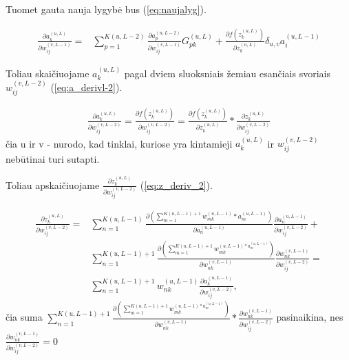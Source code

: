 Tuomet gauta nauja lygybė bus (\ref{eq:naujalyg}).

\begin{equation}\label{eq:naujalyg}
  \begin{aligned}
    \frac{\partial a_k^{(u, L)}}{\partial w_{ij}^{(v,L-1)}} = &
      \sum_{p=1}^{K(u,L-2)}
      \frac{\partial a_p^{(u,L-2)}}{\partial w_{ij}^{(v,L-1)}}G_{pk}^{(u,L)} + \frac{\partial f(z_k^{(u, L)})}{\partial z_k^{(u,L)}} \delta_{u,v}a_i^{(u,L-1)}
\end{aligned}
\end{equation}


Toliau skaičiuojame $a_k^{(u, L)}$ pagal dviem sluoksniais žemiau esančiais svoriais $w_{ij}^{(v,L-2)}$ (\ref{eq:a_derivl-2}).

\begin{equation} \label{eq:a_derivl-2}
  \begin{aligned}
  \frac{\partial a_k^{(u, L)}}{\partial w_{ij}^{(v,L-2)}} =
  \frac{\partial f(z_k^{(u, L)})}{\partial w_{ij}^{(v,L-2)}} =
  \frac{\partial f(z_k^{(u, L)})}{\partial z_k^{(u,L)}} *
  \frac{\partial z_k^{(u,L)}}{\partial w_{ij}^{(v,L-2)}}
  \end{aligned}
\end{equation}
čia u ir v - nurodo, kad tinklai, kuriose yra kintamieji $a_k^{(u, L)}$ ir $w_{ij}^{(v,L-2)}$ nebūtinai turi sutapti.

Toliau apskaičiuojame $\frac{\partial z_k^{(u,L)}}{\partial w_{ij}^{(v,L-2)}}$ (\ref{eq:z_deriv_2}).

\begin{equation} \label{eq:z_deriv_2}
  \begin{aligned}
    \frac{\partial z_k^{(u,L)}}{\partial w_{ij}^{(v,L-2)}} =&
      \sum_{n=1}^{K(u, L-1)} \frac{\partial (\sum_{m=1}^{K(u,L-1)+1} w_{mk}^{(u,L-1)} * a_m^{(u,L-1)} )}{\partial a_n^{(u,L-1)}}
      \frac{\partial a_n^{(u,L-1)}}{\partial w_{ij}^{(v,L-2)}} + \\
      &\sum_{n=1}^{K(u, L-1)+1} \frac{\partial (\sum_{m=1}^{K(u,L-1)+1}  w_{mk}^{(u,L-1) * a_m^{(u,L-1)}} )}{\partial w_{nk}^{(v,L-1)}}
      \frac{\partial w_{nk}^{(v,L-1)}}{\partial w_{ij}^{(v,L-2)}} =\\
    &\sum_{n=1}^{K(u, L-1)+1} w_{nk}^{(u,L-1)} \frac{\partial a_k^{(u, L-1)}}{\partial w_{ij}^{(v,L-2)}},
  \end{aligned}
\end{equation}
čia suma $\sum_{n=1}^{K(u, L-1)+1} \frac{\partial (\sum_{m=1}^{K(u,L-1)+1} w_{mk}^{(u,L-1) * a_m^{(u,L-1)}} )}{\partial w_{nk}^{(v,L-1)}} *
\frac{\partial w_{nk}^{(v,L-1)}}{\partial w_{ij}^{(v,L-2)}}$ pasinaikina, nes $\frac{\partial w_{nk}^{(v,L-1)}}{\partial w_{ij}^{(v,L-2)}}=0$

